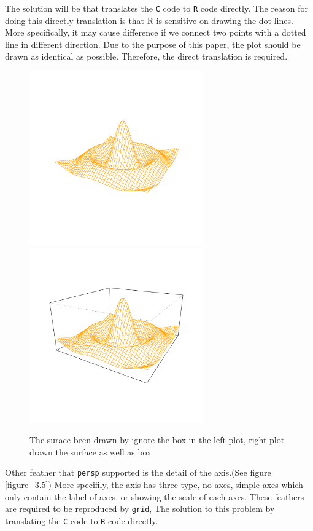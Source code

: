 \documentclass[paper=a4, fontsize=11pt]{report}
\begin{document}
The solution will be that translates the \texttt{C} code to \texttt{R} code directly. The reason for doing this directly translation is that R is sensitive on drawing the dot lines. More specifically, it may cause difference if we connect two points with a dotted line in different direction. Due to the purpose of this paper, the plot should be drawn as identical as possible. Therefore, the direct translation is required.\\


\begin{figure}[h]
\begin{center}
  \includegraphics[height = 7.5cm, width = 7.5cm]{figure/box_example_1.pdf}
  \includegraphics[height = 7.5cm, width = 7.5cm]{figure/box_example_2.pdf}
  \caption{The surace been drawn by ignore the box in the left plot, right plot drawn the surface as well as box}
  	\label{figure_3.4}
\end{center}
\end{figure}

Other feather that \texttt{persp} supported is the detail of the axis.(See figure \ref{figure_3.5}) More specifily, the axis has three type, no axes, simple axes which only contain the label of axes, or showing the scale of each axes. These feathers are required to be reproduced by \texttt{grid}, The solution to this problem by translating the \texttt{C} code to \texttt{R} code directly.
\end{document}
